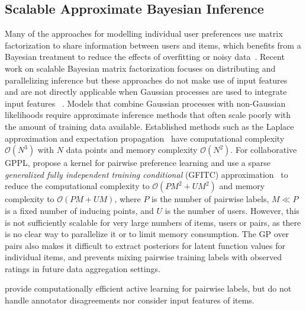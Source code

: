 \subsection{Scalable Approximate Bayesian Inference}


Many of the approaches for modelling individual user preferences use matrix factorization 
to share information between users and items,
which benefits from a Bayesian treatment to reduce the effects of overfitting or noisy data~\citep{saha2015scalable}.
Recent work on scalable Bayesian matrix factorization focuses on distributing and parallelizing 
 inference but 
 these approaches do not make use of input features 
 and are not directly applicable when Gaussian processes are used to integrate input features
 ~\citep{ahn2015large,saha2015scalable,vander2017distributed,chen2018large}. 
Models that combine Gaussian processes with non-Gaussian likelihoods 
require approximate inference methods that often scale poorly with 
the amount of training data available. 
Established methods such as the Laplace approximation 
and expectation propagation~\citep{rasmussen_gaussian_2006} have
computational complexity $\mathcal{O}(N^3)$ with $N$ data points
 and memory complexity $\mathcal{O}(N^2)$. 
For collaborative GPPL, \citet{houlsby2012collaborative}
propose a  kernel for pairwise 
preference learning and use a sparse
\emph{generalized fully independent training conditional} (GFITC) 
approximation~\citep{snelson2006sparse} to reduce the computational complexity to $\mathcal{O}(PM^2 + UM^2)$ and 
memory complexity to $\mathcal{O}(PM + UM)$,
where $P$ is the number of pairwise labels, $M \ll P$ is a fixed number of inducing points, and $U$ is the number of users.
However, this is not sufficiently scalable
 for very large numbers of items, users or pairs, as there is no clear way to parallelize it or to limit memory consumption.
The GP over pairs also makes it difficult to extract posteriors for latent function values for individual items,
and prevents mixing pairwise training labels
with observed ratings in future data aggregation settings.

\citet{li2018hybrid} provide computationally efficient active learning for pairwise labels, but
do not handle annotator disagreements nor consider input features of items.


